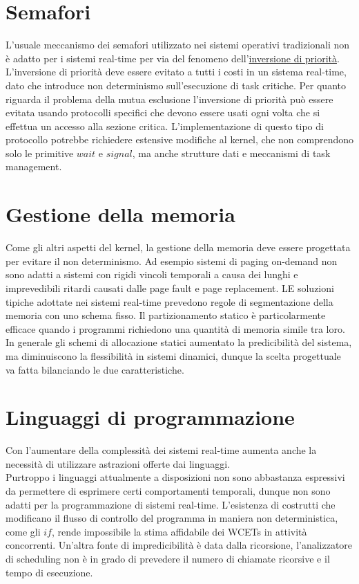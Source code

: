 \documentclass[12pt,openany,onesided]{book}
\begin{document}
\section{Semafori}
L'usuale meccanismo dei semafori utilizzato nei sistemi operativi tradizionali non è adatto per i sistemi real-time per via del fenomeno dell'\href{https://en.wikipedia.org/wiki/Priority_inversion}{inversione di priorità}.
L'inversione di priorità deve essere evitato a tutti i costi in un sistema real-time, dato che introduce non determinismo sull'esecuzione di task critiche.
Per quanto riguarda il problema della mutua esclusione l'inversione di priorità può essere evitata usando protocolli specifici che devono essere usati ogni 
volta che si effettua un accesso alla sezione critica.
L'implementazione di questo tipo di protocollo potrebbe richiedere estensive modifiche al kernel, che non comprendono solo le primitive $wait$ e $signal$, ma anche strutture dati e meccanismi di task management.
\section{Gestione della memoria}
Come gli altri aspetti del kernel, la gestione della memoria deve essere progettata per evitare il non determinismo.
Ad esempio sistemi di paging on-demand non sono adatti a sistemi con rigidi vincoli temporali a causa dei lunghi e imprevedibili ritardi causati dalle page fault e page replacement.
LE soluzioni tipiche adottate nei sistemi real-time prevedono regole di segmentazione della memoria con uno schema fisso. Il partizionamento statico è particolarmente efficace quando i programmi richiedono
una quantità di memoria simile tra loro.
In generale gli schemi di allocazione statici aumentato la predicibilità del sistema, ma diminuiscono la flessibilità in sistemi dinamici, dunque la scelta progettuale va fatta bilanciando le due caratteristiche.
\section{Linguaggi di programmazione}
Con l'aumentare della complessità dei sistemi real-time aumenta anche la necessità di utilizzare astrazioni offerte dai linguaggi.
\\
Purtroppo i linguaggi attualmente a disposizioni non sono abbastanza espressivi da permettere di esprimere certi comportamenti temporali, dunque non sono adatti per la programmazione di sistemi real-time.
L'esistenza di costrutti che modificano il flusso di controllo del programma in maniera non deterministica, come gli $if$, rende impossibile la stima affidabile dei WCETs in attività concorrenti.
Un'altra fonte di impredicibilità è data dalla ricorsione, l'analizzatore di scheduling non è in grado di prevedere il numero di chiamate ricorsive e il tempo di esecuzione.
\end{document}
